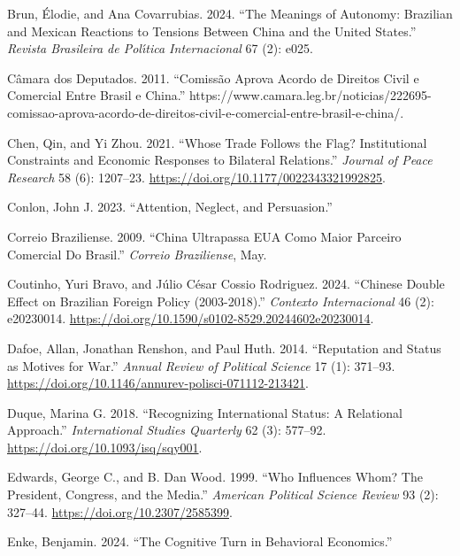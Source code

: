 \documentclass[
  12pt,
]{article}
\newlength{\cslhangindent}
\newenvironment{CSLReferences}[2] %
 {\begin{list}{}{%
  \setlength{\itemindent}{0pt}
  \setlength{\leftmargin}{0pt}
  \setlength{\parsep}{0pt}
  \ifodd #1
   \setlength{\leftmargin}{\cslhangindent}
   \setlength{\itemindent}{-1\cslhangindent}
  \fi
  \setlength{\itemsep}{#2\baselineskip}}}
 {\end{list}}
\begin{document}
\begin{CSLReferences}{1}{0}
Brun, Élodie, and Ana Covarrubias. 2024. {``The Meanings of Autonomy:
{Brazilian} and Mexican Reactions to Tensions Between China and the
United States.''} \emph{Revista Brasileira de Pol{ı́}tica Internacional}
67 (2): e025.

Câmara dos Deputados. 2011. {``Comiss{ã}o Aprova Acordo de Direitos
Civil e Comercial Entre {Brasil} e {China}.''}
https://www.camara.leg.br/noticias/222695-comissao-aprova-acordo-de-direitos-civil-e-comercial-entre-brasil-e-china/.

Chen, Qin, and Yi Zhou. 2021. {``Whose Trade Follows the Flag?
{Institutional} Constraints and Economic Responses to Bilateral
Relations.''} \emph{Journal of Peace Research} 58 (6): 1207--23.
\url{https://doi.org/10.1177/0022343321992825}.

Conlon, John J. 2023. {``Attention, {Neglect}, and {Persuasion}.''}

Correio Braziliense. 2009. {``China Ultrapassa {EUA} Como Maior Parceiro
Comercial Do {Brasil}.''} \emph{Correio Braziliense}, May.

Coutinho, Yuri Bravo, and Júlio César Cossio Rodriguez. 2024. {``Chinese
{Double Effect} on {Brazilian Foreign Policy} (2003-2018).''}
\emph{Contexto Internacional} 46 (2): e20230014.
\url{https://doi.org/10.1590/s0102-8529.20244602e20230014}.

Dafoe, Allan, Jonathan Renshon, and Paul Huth. 2014. {``Reputation and
{Status} as {Motives} for {War}.''} \emph{Annual Review of Political
Science} 17 (1): 371--93.
\url{https://doi.org/10.1146/annurev-polisci-071112-213421}.

Duque, Marina G. 2018. {``Recognizing {International Status}: {A
Relational Approach}.''} \emph{International Studies Quarterly} 62 (3):
577--92. \url{https://doi.org/10.1093/isq/sqy001}.

Edwards, George C., and B. Dan Wood. 1999. {``Who {Influences Whom}?
{The President}, {Congress}, and the {Media}.''} \emph{American
Political Science Review} 93 (2): 327--44.
\url{https://doi.org/10.2307/2585399}.

Enke, Benjamin. 2024. {``The Cognitive Turn in Behavioral Economics.''}


\end{CSLReferences}
\end{document}
